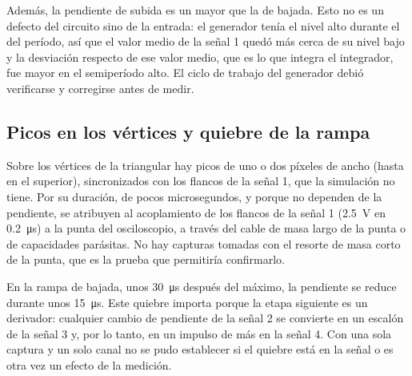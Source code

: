 Además, la pendiente de subida es un  mayor que la de bajada. Esto no es un defecto del circuito sino de la entrada: el generador tenía el nivel alto durante el  del período, así que el valor medio de la señal 1 quedó más cerca de su nivel bajo y la desviación respecto de ese valor medio, que es lo que integra el integrador, fue mayor en el semiperíodo alto. El ciclo de trabajo del generador debió verificarse y corregirse antes de medir.

\subsection{Picos en los vértices y quiebre de la rampa}
Sobre los vértices de la triangular hay picos de uno o dos píxeles de ancho (hasta  en el superior), sincronizados con los flancos de la señal 1, que la simulación no tiene. Por su duración, de pocos microsegundos, y porque no dependen de la pendiente, se atribuyen al acoplamiento de los flancos de la señal 1 (\SI{2,5}{\volt} en \SI{0,2}{\micro\second}) a la punta del osciloscopio, a través del cable de masa largo de la punta o de capacidades parásitas. No hay capturas tomadas con el resorte de masa corto de la punta, que es la prueba que permitiría confirmarlo.

En la rampa de bajada, unos \SI{30}{\micro\second} después del máximo, la pendiente se reduce durante unos \SI{15}{\micro\second}. Este quiebre importa porque la etapa siguiente es un derivador: cualquier cambio de pendiente de la señal 2 se convierte en un escalón de la señal 3 y, por lo tanto, en un impulso de más en la señal 4. Con una sola captura y un solo canal no se pudo establecer si el quiebre está en la señal o es otra vez un efecto de la medición.

